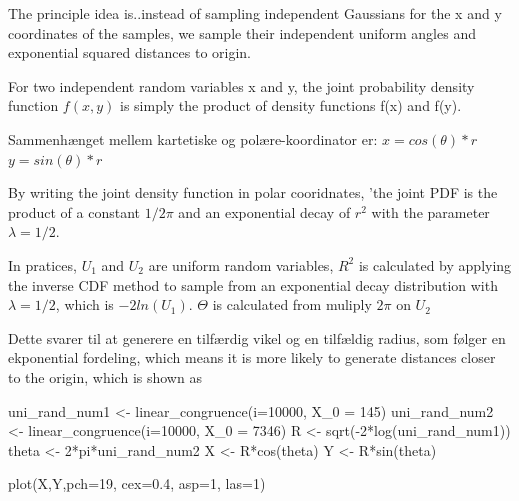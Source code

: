 \documentclass[
]{article}
\newenvironment{Shaded}{\begin{snugshade}}{\end{snugshade}}
\newcommand{\AttributeTok}[1]{\textcolor[rgb]{0.77,0.63,0.00}{#1}}
\newcommand{\DecValTok}[1]{\textcolor[rgb]{0.00,0.00,0.81}{#1}}
\newcommand{\FloatTok}[1]{\textcolor[rgb]{0.00,0.00,0.81}{#1}}
\newcommand{\FunctionTok}[1]{\textcolor[rgb]{0.00,0.00,0.00}{#1}}
\newcommand{\NormalTok}[1]{#1}
\newcommand{\OtherTok}[1]{\textcolor[rgb]{0.56,0.35,0.01}{#1}}
\newcommand{\SpecialCharTok}[1]{\textcolor[rgb]{0.00,0.00,0.00}{#1}}
\begin{document}
The principle idea is..instead of sampling independent Gaussians for the
x and y coordinates of the samples, we sample their independent uniform
angles and exponential squared distances to origin.

For two independent random variables x and y, the joint probability
density function \(f(x,y)\) is simply the product of density functions
f(x) and f(y).

Sammenhænget mellem kartetiske og polære-koordinator er:
\(x = cos(\theta)*r\) \(y = sin(\theta)*r\)

By writing the joint density function in polar cooridnates, 'the joint
PDF is the product of a constant \(1/2\pi\) and an exponential decay of
\(r^2\) with the parameter \(\lambda = 1/2\).

In pratices, \(U_1\) and \(U_2\) are uniform random variables, \(R^2\)
is calculated by applying the inverse CDF method to sample from an
exponential decay distribution with \(\lambda = 1/2\), which is
\(-2ln(U_1)\). \(\Theta\) is calculated from muliply \(2\pi\) on \(U_2\)

Dette svarer til at generere en tilfærdig vikel og en tilfældig radius,
som følger en ekponential fordeling, which means it is more likely to
generate distances closer to the origin, which is shown as

\begin{Shaded}
\begin{Highlighting}[]
\NormalTok{uni\_rand\_num1 }\OtherTok{\textless{}{-}} \FunctionTok{linear\_congruence}\NormalTok{(}\AttributeTok{i=}\DecValTok{10000}\NormalTok{, }\AttributeTok{X\_0 =} \DecValTok{145}\NormalTok{)}
\NormalTok{uni\_rand\_num2 }\OtherTok{\textless{}{-}} \FunctionTok{linear\_congruence}\NormalTok{(}\AttributeTok{i=}\DecValTok{10000}\NormalTok{, }\AttributeTok{X\_0 =} \DecValTok{7346}\NormalTok{)}
\NormalTok{R }\OtherTok{\textless{}{-}} \FunctionTok{sqrt}\NormalTok{(}\SpecialCharTok{{-}}\DecValTok{2}\SpecialCharTok{*}\FunctionTok{log}\NormalTok{(uni\_rand\_num1))}
\NormalTok{theta }\OtherTok{\textless{}{-}} \DecValTok{2}\SpecialCharTok{*}\NormalTok{pi}\SpecialCharTok{*}\NormalTok{uni\_rand\_num2}
\NormalTok{X }\OtherTok{\textless{}{-}}\NormalTok{ R}\SpecialCharTok{*}\FunctionTok{cos}\NormalTok{(theta)}
\NormalTok{Y }\OtherTok{\textless{}{-}}\NormalTok{ R}\SpecialCharTok{*}\FunctionTok{sin}\NormalTok{(theta)}

\FunctionTok{plot}\NormalTok{(X,Y,}\AttributeTok{pch=}\DecValTok{19}\NormalTok{, }\AttributeTok{cex=}\FloatTok{0.4}\NormalTok{, }\AttributeTok{asp=}\DecValTok{1}\NormalTok{, }\AttributeTok{las=}\DecValTok{1}\NormalTok{)}
\end{Highlighting}
\end{Shaded}
\end{document}
